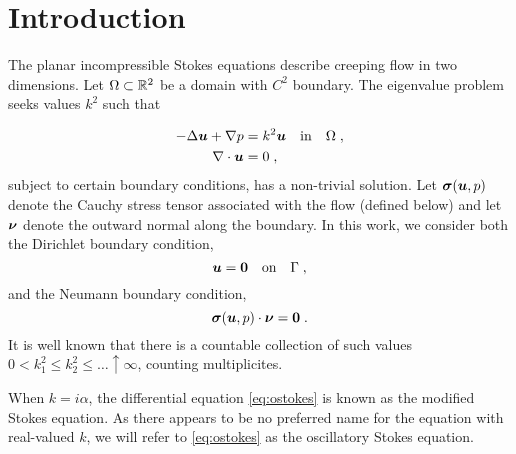 \section{Introduction}

The planar incompressible Stokes equations describe
creeping flow in two dimensions. Let $\Omega \subset \mathbb{R}^2$
be a domain with $C^2$ boundary. The eigenvalue problem seeks
values $k^2$ such that 

\begin{equation}
\begin{aligned}
  -\Delta {\boldsymbol u} + \nabla p &= k^2 {\boldsymbol u} \quad \textrm{in} \quad
  \Omega \label{eq:ostokes} \; , \\
  \nabla \cdot {\boldsymbol u} &= 0 \; ,
\end{aligned}
\end{equation}
subject to certain boundary conditions, has a non-trivial solution.
Let ${\boldsymbol \sigma}({\boldsymbol u},p)$ denote the Cauchy stress tensor
associated with the flow (defined below) and let ${\boldsymbol \nu}$ denote
the outward normal along the boundary.
In this work, we consider both the Dirichlet boundary condition,
\begin{equation}
  {\boldsymbol u} = {\boldsymbol 0} \quad \textrm{on} \quad \Gamma \label{eq:ostokes_dir} \; ,
\end{equation}
and the Neumann boundary condition,
\begin{equation}
  {\boldsymbol \sigma}( {\boldsymbol u}, p ) \cdot {\boldsymbol \nu}  = {\boldsymbol 0} \; . \label{eq:ostokes_neu}
\end{equation}
It is well known that there is a countable collection of such
values $0 < k_{1}^{2} \leq k_{2}^2 \leq \ldots \uparrow \infty$,
counting multiplicites.

\begin{remark}
  When $k = i\alpha$, the differential equation
  \cref{eq:ostokes} is known as the modified Stokes
  equation. As there appears to be no preferred
  name for the equation with real-valued $k$,
  we will refer to \cref{eq:ostokes} as the
  oscillatory Stokes equation.
\end{remark}

